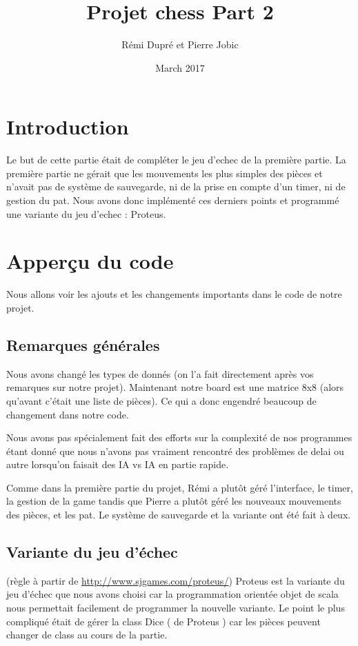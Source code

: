 \documentclass{article}
\title{Projet chess Part 2}
\author{Rémi Dupré et Pierre Jobic }
\date{March 2017}
\begin{document}
\maketitle

\section{Introduction}

Le but de cette partie était de compléter le jeu d'echec de la première partie.
La première partie ne gérait que les mouvements les plus simples des pièces et n'avait pas de système de sauvegarde, ni de la prise en compte d'un timer, ni de gestion du pat.
Nous avons donc implémenté ces derniers points et programmé une variante du jeu d'echec : Proteus.

\section{Apperçu du code}
Nous allons voir les ajouts et les changements importants dans le code de notre projet.

\subsection{Remarques générales}

Nous avons changé les types de donnés (on l'a fait directement après vos remarques sur notre projet). Maintenant notre board est une matrice 8x8 (alors qu'avant c'était une liste de pièces).
Ce qui a donc engendré beaucoup de changement dans notre code.

Nous avons pas spécialement fait des efforts sur la complexité de nos programmes étant donné que nous n'avons pas vraiment rencontré des problèmes de delai ou autre lorsqu'on faisait des IA vs IA en partie rapide.

Comme dans la première partie du projet, Rémi a plutôt géré l'interface, le timer, la gestion de la game tandis que Pierre a plutôt géré les nouveaux mouvements des pièces, et les pat. Le système de sauvegarde et la variante ont été fait à deux.

\subsection{Variante du jeu d'échec}
(règle à partir de \url{http://www.sjgames.com/proteus/})
Proteus est la variante du jeu d'échec que nous avons choisi car la programmation orientée objet de scala nous permettait facilement de programmer la nouvelle variante.
Le point le plus compliqué était de gérer la class Dice ( de Proteus ) car les pièces peuvent changer de class au cours de la partie.
\end{document}
